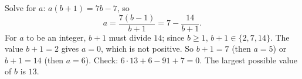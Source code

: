 Solve for $a$: $a(b+1)=7b-7$, so
\[a=\dfrac{7(b-1)}{b+1}=7-\dfrac{14}{b+1}.\]
For $a$ to be an integer, $b+1$ must divide $14$; since $b\ge1$, $b+1\in\{2,7,14\}$. The value $b+1=2$ gives $a=0$, which is not positive. So $b+1=7$ (then $a=5$) or $b+1=14$ (then $a=6$). Check: $6\cdot13+6-91+7=0$. The largest possible value of $b$ is $\boxed{13}$.
